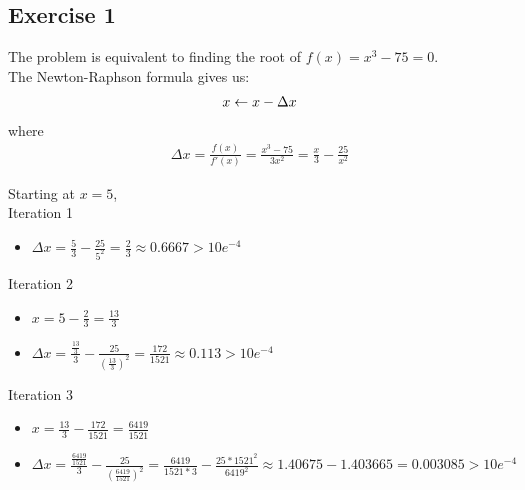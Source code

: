 \documentclass[12pt]{article}
\begin{document}
\subsection{Exercise 1}

The problem is equivalent to finding the root of $f(x) = x^3-75 = 0$. \\
The Newton-Raphson formula gives us: \\
\begin{align}
\notag
x \gets x - \Delta x
\end{align}
where
\begin{align}
\Delta x = \frac{f(x)}{f\prime(x)} = \frac{x^3-75}{3x^2} = \frac{x}{3} - \frac{25}{x^2}
\end{align}

\noindent Starting at $x = 5$, \\

\noindent Iteration 1 \\
\begin{itemize}
  \item $\Delta x = \frac{5}{3} - \frac{25}{5^2} = \frac{2}{3} \approx 0.6667 >  10e^{-4}$ \\
\end{itemize}

\noindent Iteration 2 \\
\begin{itemize}
  \item $x = 5 - \frac{2}{3} = \frac{13}{3}$ \\
  \item $\Delta x = \frac{\frac{13}{3}}{3} - \frac{25}{(\frac{13}{3})^2} = \frac{172}{1521} \approx 0.113 > 10e^{-4}$ \\
\end{itemize}

\noindent Iteration 3 \\
\begin{itemize}
  \item $x = \frac{13}{3} - \frac{172}{1521} = \frac{6419}{1521}$ \\
  \item $\Delta x = \frac{\frac{6419}{1521}}{3} - \frac{25}{(\frac{6419}{1521})^2} = \frac{6419}{1521*3} - \frac{25 * 1521^2}{6419^2} \approx 1.40675 - 1.403665 = 0.003085 > 10e^{-4} $\\
\end{itemize}
\end{document}
